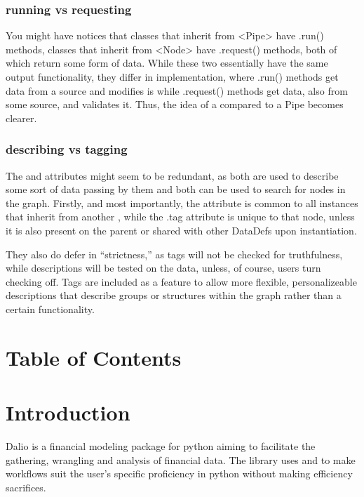 \documentclass[letterpaper,10pt,english]{sphinxmanual}
\begin{document}
\subsection{running vs requesting}
\label{\detokenize{developers-guide:running-vs-requesting}}
You might have notices that classes that inherit from \textless{}Pipe\textgreater{} have .run() methods, classes that inherit from \textless{}Node\textgreater{} have .request() methods, both of which return some form of data. While these two essentially have the same output functionality, they differ in implementation, where .run() methods get data from a source and modifies is while .request() methods get data, also from some source, and validates it. Thus, the idea of a  compared to a Pipe becomes clearer.


\subsection{describing vs tagging}
\label{\detokenize{developers-guide:describing-vs-tagging}}
The  and  attributes might seem to be redundant, as both are used to describe some sort of data passing by them and both can be used to search for nodes in the graph. Firstly, and most importantly, the  attribute is common to all  instances that inherit from another , while the .tag attribute is unique to that node, unless it is also present on the parent  or shared with other DataDefs upon instantiation.

They also do defer in “strictness,” as tags will not be checked for truthfulness, while descriptions will be tested on the data, unless, of course, users turn checking off. Tags are included as a feature to allow more flexible, personalizeable descriptions that describe groups or structures within the graph rather than a certain functionality.


\chapter{Table of Contents}
\label{\detokenize{index:table-of-contents}}

\chapter{Introduction}
\label{\detokenize{index:introduction}}\label{\detokenize{index:id1}}
Dal\sphinxhyphen{}io is a financial modeling package for python aiming to facilitate the gathering, wrangling and analysis of financial data. The library uses  and  to make workflows suit the user’s specific proficiency in python without making efficiency
sacrifices.
\end{document}
